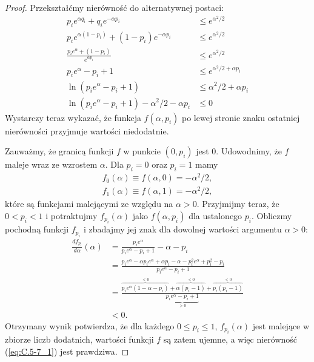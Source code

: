\begin{proof}
	Przekształćmy nierówność do alternatywnej postaci:
	\begin{align*}
		p_ie^{\alpha q_i}+q_ie^{-\alpha p_i} &\le e^{\alpha^2\!/2} \\[1mm]
		p_ie^{\alpha(1-p_i)}+(1-p_i)e^{-\alpha p_i} &\le e^{\alpha^2\!/2} \\[2mm]
		\frac{p_ie^\alpha+(1-p_i)}{e^{\alpha p_i}} &\le e^{\alpha^2\!/2} \\[1mm]
		p_ie^\alpha-p_i+1 &\le e^{\alpha^2\!/2+\alpha p_i} \\[1mm]
		\ln(p_ie^\alpha-p_i+1) &\le \alpha^2\!/2+\alpha p_i \\[1mm]
		\ln(p_ie^\alpha-p_i+1)-\alpha^2\!/2-\alpha p_i &\le 0
	\end{align*}
	Wystarczy teraz wykazać, że funkcja $f(\alpha,p_i)$ po lewej stronie znaku ostatniej nierówności przyjmuje wartości niedodatnie.

	Zauważmy, że granicą funkcji $f$ w punkcie $(0,p_i)$ jest 0. Udowodnimy, że $f$ maleje wraz ze wzrostem $\alpha$. Dla $p_i=0$ oraz $p_i=1$ mamy
	\begin{align*}
	    f_0(\alpha) \equiv f(\alpha,0) = -\alpha^2\!/2, \\
		f_1(\alpha) \equiv f(\alpha,1) = -\alpha^2\!/2,
	\end{align*}
	które są funkcjami malejącymi ze względu na $\alpha>0$. Przyjmijmy teraz, że $0<p_i<1$ i potraktujmy $f_{p_i}(\alpha)$ jako $f(\alpha,p_i)$ dla ustalonego $p_i$. Obliczmy pochodną funkcji $f_{p_i}$ i zbadajmy jej znak dla dowolnej wartości argumentu $\alpha>0$:
	\begin{align*}
	    \frac{df_{p_i}}{d\alpha}(\alpha) &= \frac{p_ie^\alpha}{p_ie^\alpha-p_i+1}-\alpha-p_i \\[1mm]
		&= \frac{p_ie^\alpha-\alpha p_ie^\alpha+\alpha p_i-\alpha-p_i^2e^\alpha+p_i^2-p_i}{p_ie^\alpha-p_i+1} \\[1mm]
		&= \frac{\overbrace{p_ie^\alpha(1-\alpha-p_i)}^{<0}+\overbrace{\alpha(p_i-1)}^{<0}+\overbrace{p_i(p_i-1)}^{<0}}{\underbrace{p_ie^\alpha-p_i+1}_{>0}} \\
		&< 0.
	\end{align*}
	Otrzymany wynik potwierdza, że dla każdego $0\le p_i\le1$, $f_{p_i}(\alpha)$ jest malejące w zbiorze liczb dodatnich, wartości funkcji $f$ są zatem ujemne, a więc nierówność (\ref{eq:C.5-7_1}) jest prawdziwa.


\end{proof}

